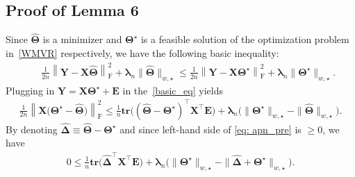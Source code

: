 \documentclass[alpha-refs]{wiley-article}
\begin{document}
\subsection{Proof of Lemma 6}
Since $\widehat{\boldsymbol{\Theta}}$ is a minimizer and $\boldsymbol{\Theta^{\star}}$ is a feasible solution of the optimization problem in~\eqref{WMVR} respectively, we have the following basic inequality:
\begin{eqnarray} \label{basic_eq}
    & & \frac{1}{2n} \left\| \boldsymbol{Y}-\boldsymbol{X}\boldsymbol{\widehat{\Theta}} \right\|_{\text{F}}^{2} + \boldsymbol{\lambda}_{n}\|\widehat{\boldsymbol{\Theta}}\|_{w,\star} \leq \frac{1}{2n}\left\| \boldsymbol{Y}-\boldsymbol{X}\boldsymbol{\Theta^{\star}} \right\|_{\text{F}}^{2} + \boldsymbol{\lambda}_{n}\|\boldsymbol{\Theta^{\star}}\|_{w,\star}.
\end{eqnarray}
Plugging in $\boldsymbol{Y}=\boldsymbol{X}\boldsymbol{\Theta^{\star}}+\boldsymbol{E}$ in the~\eqref{basic_eq} yields
\begin{align}
    \frac{1}{2n} \left\| \boldsymbol{X} \big(\boldsymbol{\Theta^{\star}}-\boldsymbol{\widehat{\Theta}}\big) \right\|_{\text{F}}^{2} \leq \frac{1}{n} \textbf{tr}\big( ( \boldsymbol{\widehat{\Theta}} - \boldsymbol{\Theta^{\star}})^{\top} \boldsymbol{X}^{\top}\boldsymbol{E} \big) +
    \boldsymbol{\lambda}_{n} \big( \|\boldsymbol{\Theta^{\star}}\|_{w,\star} - \|\widehat{\boldsymbol{\Theta}}\|_{w,\star} \big). \label{eq: apn_pre}
\end{align}
By denoting $\boldsymbol{\widehat{\Delta}} \equiv \widehat{\boldsymbol{\Theta}} - \boldsymbol{\Theta^{\star}} $ and since left-hand side of \eqref{eq: apn_pre} is $\geq 0$, we have
\begin{eqnarray}
    0 \leq \frac{1}{n} \textbf{tr}\big( \boldsymbol{\widehat{\Delta}}^{\top} \boldsymbol{X}^{\top}\boldsymbol{E} \big) + \boldsymbol{\lambda}_{n}\big( \|\boldsymbol{\Theta^{\star}}\|_{w,\star} - \|\boldsymbol{\widehat{\Delta}} + \boldsymbol{\Theta^{\star}}\|_{w,\star} \big).  \label{eq: apn_main}
\end{eqnarray}
\end{document}

